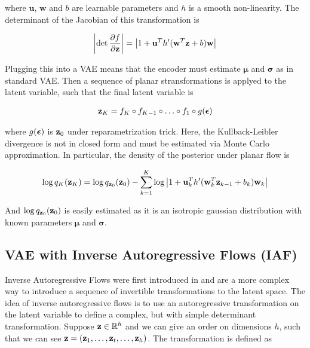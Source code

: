 \documentclass[12pt]{article}
\begin{document}
where \(\mathbf{u}\), \(\mathbf{w}\) and \(b\) are learnable parameters and \(h\) is a smooth non-linearity. The determinant of the Jacobian of this transformation is

\begin{align}
    \left| \det \frac{\partial f}{\partial \textbf{z}} \right| = \left| 1 + \mathbf{u}^T h'(\mathbf{w}^T\textbf{z} + b)\mathbf{w} \right|
\end{align}


Plugging this into a VAE means that the encoder must estimate \(\boldsymbol{\mu}\) and \(\boldsymbol{\sigma}\) as in standard VAE. Then a sequence of planar stransformations is applyed to the latent variable, such that the final latent variable is 

\begin{align}
    \textbf{z}_K = f_K \circ f_{K-1} \circ \ldots \circ f_1 \circ g(\bm{\epsilon})
\end{align}

where \(g(\bm{\epsilon})\) is \(\textbf{z}_0\) under reparametrization trick. Here, the Kullback-Leibler divergence is not in closed form and must be estimated via Monte Carlo approximation. In particular, the density of the posterior under planar flow is

\begin{align}
    \log q_K(\textbf{z}_K) = \log q_{\textbf{z}_0}(\textbf{z}_0) - \sum_{k=1}^K \log \left| 1 + \mathbf{u}_k^T h'(\mathbf{w}_k^T\textbf{z}_{k-1} + b_k)\mathbf{w}_k \right|
\end{align}

And \(\log q_{\textbf{z}_0}(\textbf{z}_0)\) is easily estimated as it is an isotropic gaussian distribution with known parameters \(\boldsymbol{\mu}\) and \(\boldsymbol{\sigma}\). 

\subsection{VAE with Inverse Autoregressive Flows (IAF)}

Inverse Autoregressive Flows were first introduced in \cite{Kingma2016ImprovedVI} and are a more complex way to introduce a sequence of invertible transformations to the latent space. The idea of inverse autoregressive flows is to use an autoregressive transformation on the latent variable to define a complex, but with simple determinant transformation. Suppose \(\textbf{z} \in \mathbb{R}^h\) and we can give an order on dimensions \(h\), such that we can see \(\textbf{z} = (\textbf{z}_1,\ldots,\textbf{z}_t,\ldots,\textbf{z}_h)\). The transformation is defined as
\end{document}
